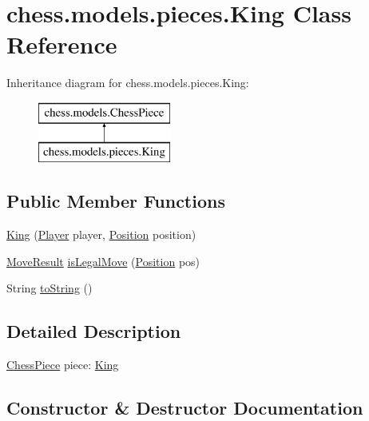 \hypertarget{classchess_1_1models_1_1pieces_1_1_king}{}\section{chess.\+models.\+pieces.\+King Class Reference}
\label{classchess_1_1models_1_1pieces_1_1_king}
Inheritance diagram for chess.\+models.\+pieces.\+King\+:\begin{figure}[H]
\begin{center}
\leavevmode
\includegraphics[height=2.000000cm]{classchess_1_1models_1_1pieces_1_1_king}
\end{center}
\end{figure}
\subsection*{Public Member Functions}
\begin{DoxyCompactItemize}
\item 
\mbox{\hyperlink{classchess_1_1models_1_1pieces_1_1_king_abc06c6362a34a9f7289c374c50d3b728}{King}} (\mbox{\hyperlink{enumchess_1_1models_1_1enums_1_1_player}{Player}} player, \mbox{\hyperlink{classchess_1_1models_1_1_position}{Position}} position)
\item 
\mbox{\hyperlink{enumchess_1_1models_1_1enums_1_1_move_result}{Move\+Result}} \mbox{\hyperlink{classchess_1_1models_1_1pieces_1_1_king_ad72471e97d1e053467189babdc18c231}{is\+Legal\+Move}} (\mbox{\hyperlink{classchess_1_1models_1_1_position}{Position}} pos)
\item 
String \mbox{\hyperlink{classchess_1_1models_1_1pieces_1_1_king_ae287258d6c093ce7d7c3196f7dde6d99}{to\+String}} ()
\end{DoxyCompactItemize}


\subsection{Detailed Description}
\mbox{\hyperlink{classchess_1_1models_1_1_chess_piece}{Chess\+Piece}} piece\+: \mbox{\hyperlink{classchess_1_1models_1_1pieces_1_1_king}{King}} 

\subsection{Constructor \& Destructor Documentation}
\mbox{\label{classchess_1_1models_1_1pieces_1_1_king_abc06c6362a34a9f7289c374c50d3b728}} 
